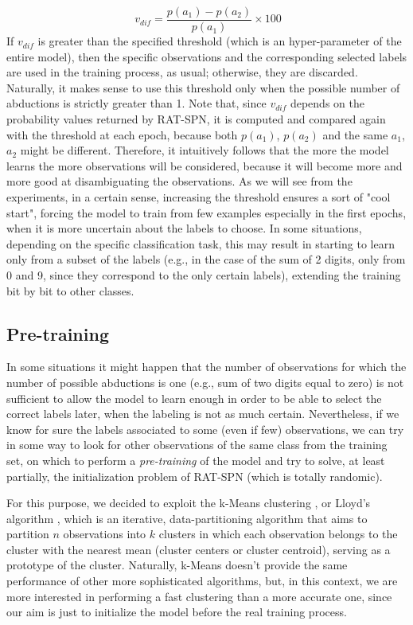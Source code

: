 \begin{equation}\
	v_{dif} = \frac{p(a_1)-p(a_2)}{p(a_1)} \times 100 
\end{equation}
If $v_{dif}$ is greater than the specified threshold (which is an hyper-parameter of the entire model), then the specific observations and the corresponding selected labels are used in the training process, as usual; otherwise, they are discarded. Naturally, it makes sense to use this threshold only when the possible number of abductions is strictly greater than 1. Note that, since $v_{dif}$ depends on the probability values returned by RAT-SPN, it is computed and compared again with the threshold at each epoch, because both $p(a_1)$, $p(a_2)$ and the same $a_1$, $a_2$ might be different. Therefore, it intuitively follows that the more the model learns the more observations will be considered, because it will become more and more good at disambiguating the observations. As we will see from the experiments, in a certain sense, increasing the threshold ensures a sort of "cool start", forcing the model to train from few examples especially in the first epochs, when it is more uncertain about the labels to choose. In some situations, depending on the specific classification task, this may result in starting to learn only from a subset of the labels (e.g., in the case of the sum of 2 digits, only from 0 and 9, since they correspond to the only certain labels), extending the training bit by bit to other classes.

\subsection{Pre-training}
\label{clustering}
In some situations it might happen that the number of observations for which the number of possible abductions is one (e.g., sum of two digits equal to zero) is not sufficient to allow the model to learn enough in order to be able to select the correct labels later, when the labeling is not as much certain. Nevertheless, if we know for sure the labels associated to some (even if few) observations, we can try in some way to look for other observations of the same class from the training set, on which to perform a \textit{pre-training} of the model and try to solve, at least partially, the initialization problem of RAT-SPN (which is totally randomic).

For this purpose, we decided to exploit the k-Means clustering \cite{macqueen1967}, or Lloyd’s algorithm \cite{1056489}, which is an iterative, data-partitioning algorithm that aims to partition $n$ observations into $k$ clusters in which each observation belongs to the cluster with the nearest mean (cluster centers or cluster centroid), serving as a prototype of the cluster. Naturally, k-Means doesn't provide the same performance of other more sophisticated algorithms, but, in this context, we are more interested in performing a fast clustering than a more accurate one, since our aim is just to initialize the model before the real training process.

